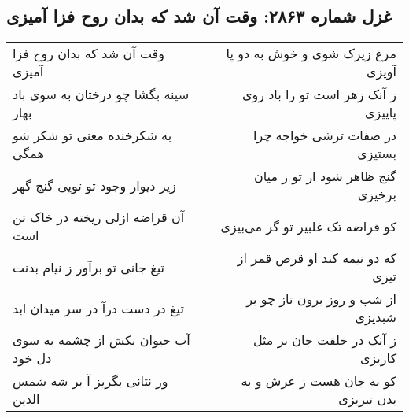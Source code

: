 \begin{center}
\section*{غزل شماره ۲۸۶۳: وقت آن شد که بدان روح فزا آمیزی}
\label{sec:2863}
\begin{longtable}{l p{0.5cm} r}
وقت آن شد که بدان روح فزا آمیزی
&&
مرغ زیرک شوی و خوش به دو پا آویزی
\\
سینه بگشا چو درختان به سوی باد بهار
&&
ز آنک زهر است تو را باد روی پاییزی
\\
به شکرخنده معنی تو شکر شو همگی
&&
در صفات ترشی خواجه چرا بستیزی
\\
زیر دیوار وجود تو تویی گنج گهر
&&
گنج ظاهر شود ار تو ز میان برخیزی
\\
آن قراضه ازلی ریخته در خاک تن است
&&
کو قراضه تک غلبیر تو گر می‌بیزی
\\
تیغ جانی تو برآور ز نیام بدنت
&&
که دو نیمه کند او قرص قمر از تیزی
\\
تیغ در دست درآ در سر میدان ابد
&&
از شب و روز برون تاز چو بر شبدیزی
\\
آب حیوان بکش از چشمه به سوی دل خود
&&
ز آنک در خلقت جان بر مثل کاریزی
\\
ور نتانی بگریز آ بر شه شمس الدین
&&
کو به جان هست ز عرش و به بدن تبریزی
\\
\end{longtable}
\end{center}
